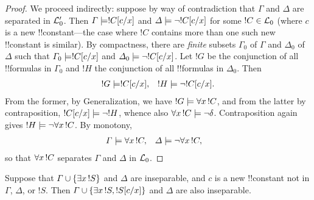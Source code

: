 \documentclass[../../include/open-logic-section]{subfiles}
\begin{document}
\begin{proof}
We proceed indirectly: suppose by way of contradiction that $\Gamma$
and $\Delta$ are separated in $\mathcal L'_0$. Then $\Gamma \Entails
\Subst{!C}{c}{x}$ and $\Delta \Entails \lnot \Subst{!C}{c}{x}$ for some $!C \in
\mathcal L_0$ (where $c$ is a new !!{constant}---the case where $!C$
contains more than one such new !!{constant} is similar). By
compactness, there are \emph{finite} subsets $\Gamma_0$ of $\Gamma$
and $\Delta_0$ of $\Delta$ such that $\Gamma_0 \Entails \Subst{!C}{c}{x}$
and $\Delta_0 \Entails \lnot \Subst{!C}{c}{x}$. Let $!G$ be the
conjunction of all !!{formula}s in $\Gamma_0$ and $!H$ the
conjunction of all !!{formula}s in $\Delta_0$. Then
\begin{align*}
  !G & \Entails \Subst{!C}{c}{x}, & !H  \Entails \lnot \Subst{!C}{c}{x}.
\end{align*}
From the former, by Generalization, we have $!G \Entails
\lforall[x][!C]$, and from the latter by contraposition,
$\Subst{!C}{c}{x} \Entails \lnot !H$, whence also $\lforall[x][!C]
\Entails \lnot \delta$. Contraposition again gives $!H \Entails
\lnot \lforall[x][!C]$. By monotony,
\begin{align*}
  \Gamma &\Entails \lforall[x][!C], & 
  \Delta & \Entails \lnot \lforall[x][!C],
\end{align*}
so that $\lforall[x][!C]$ separates $\Gamma$ and $\Delta$ in
$\mathcal L_0$. 
\end{proof}

\begin{lem}
Suppose that $\Gamma \cup \{ \lexists[x][!S] \}$ and $\Delta$ are
inseparable, and $c$ is a new !!{constant} not in $\Gamma$, $\Delta$,
or $!S$. Then $\Gamma \cup \{ \lexists[x][!S], \Subst{!S}{c}{x} \}$
and $\Delta$ are also inseparable.
\end{lem}
\end{document}
